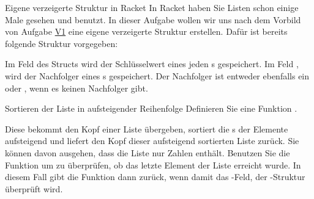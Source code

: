 \documentclass{../tuda-exercise}
\begin{document}
  \clearpage

  \begin{task}[credit=\stars{3}{3}]{Eigene verzeigerte Struktur in Racket}
    In Racket haben Sie Listen schon einige Male gesehen und benutzt. In dieser Aufgabe wollen
    wir uns nach dem Vorbild von Aufgabe \hyperref[task:V1]{V1} eine eigene verzeigerte Struktur
    erstellen. Dafür ist bereits folgende Struktur vorgegeben:

    

    Im Feld  des Structs wird der Schlüsselwert eines jeden
    s gespeichert. Im Feld , wird der Nachfolger eines
    s gespeichert. Der Nachfolger ist entweder ebenfalls ein
     oder , wenn es keinen Nachfolger gibt.

    \begin{subtask*}{Sortieren der Liste in aufsteigender Reihenfolge}
      Definieren Sie eine Funktion .

      \br

      Diese bekommt den Kopf einer Liste übergeben, sortiert die s der
      Elemente aufsteigend und liefert den Kopf dieser aufsteigend sortierten Liste zurück. Sie
      können davon ausgehen, dass die Liste nur Zahlen enthält. Benutzen Sie die Funktion
       um zu überprüfen, ob das letzte Element der Liste erreicht wurde. In
      diesem Fall gibt die Funktion  dann  zurück, wenn
      damit das -Feld, der -Struktur überprüft wird.

      \clearpagesolution

      \begin{solution}
        
      \end{solution}
    \end{subtask*}
  \end{task}

  \clearpage
\end{document}
